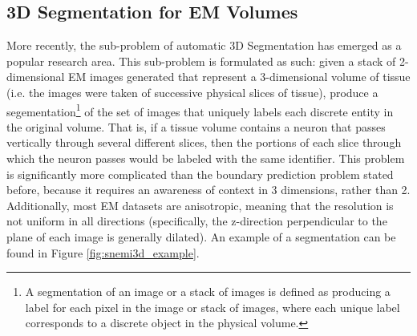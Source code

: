 \medskip

\subsection*{3D Segmentation for EM Volumes}

More recently, the sub-problem of automatic 3D Segmentation has emerged as a popular research area. This sub-problem is formulated as such: given a stack of 2-dimensional EM images generated that represent a 3-dimensional volume of tissue (i.e. the images were taken of successive physical slices of tissue), produce a segementation\footnote{A segmentation of an image or a stack of images is defined as producing a label for each pixel in the image or stack of images, where each unique label corresponds to a discrete object in the physical volume.} of the set of images that uniquely labels each discrete entity in the original volume. That is, if a tissue volume contains a neuron that passes vertically through several different slices, then the portions of each slice through which the neuron passes would be labeled with the same identifier. This problem is significantly more complicated than the boundary prediction problem stated before, because it requires an awareness of context in 3 dimensions, rather than 2. Additionally, most EM datasets are anisotropic, meaning that the resolution is not uniform in all directions (specifically, the z-direction perpendicular to the plane of each image is generally dilated). An example of a segmentation can be found in Figure \ref{fig:snemi3d_example}.

